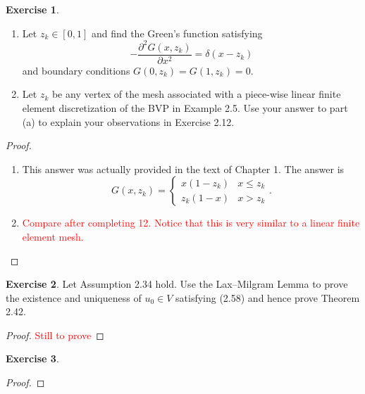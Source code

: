 \documentclass{amsart}
\theoremstyle{plain}
\theoremstyle{definition}
\newtheorem{exer}{Exercise}[section]
\newcommand{\tcr}[1]{\textcolor{red}{#1}}
\begin{document}
\begin{exer}
    \begin{enumerate}[label=\alph*.]
        \item Let $z_k \in [0,1]$ and find the Green's function satisfying 
        $$-\frac{\partial^2 G(x,z_k)}{\partial x^2 } = \delta(x-z_k)$$
        and boundary conditions $G(0,z_k) = G(1,z_k) = 0.$
        \item Let $z_k$ be any vertex of the mesh associated with a piece-wise linear finite element discretization of the BVP in Example 2.5. Use your answer to part (a) to explain your observations in Exercise 2.12.
    \end{enumerate}
\end{exer}
\begin{proof}
    \begin{enumerate}[label=\alph*.]
        \item This answer was actually provided in the text of Chapter 1. The answer is 
        $$G(x,z_k) = \begin{cases}
            x(1-z_k)& x \leq z_k \\
            z_k(1-x)& x > z_k 
        \end{cases}.$$
        \item \tcr{Compare after completing 12. Notice that this is very similar to a linear finite element mesh.}
\end{enumerate}
\end{proof}
\begin{exer}
    Let Assumption 2.34 hold. Use the Lax–Milgram Lemma to prove the existence and uniqueness of $u_0 \in V$ satisfying (2.58) and hence prove Theorem 2.42.
\end{exer}
\begin{proof}
    \tcr{Still to prove}
\end{proof}

\begin{exer}
    
\end{exer}
\begin{proof}
    
\end{proof}

\printbibliography
\end{document}
